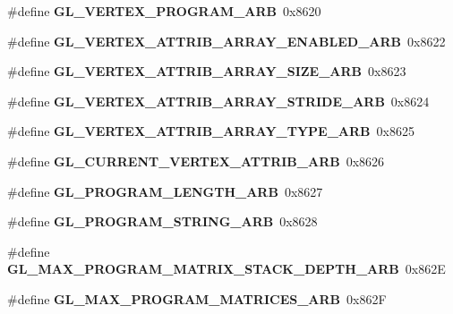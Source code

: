 \begin{DoxyCompactItemize}
\item 
\#define {\bfseries G\+L\+\_\+\+V\+E\+R\+T\+E\+X\+\_\+\+P\+R\+O\+G\+R\+A\+M\+\_\+\+A\+R\+B}~0x8620\label{_s_d_l__opengl_8h_ad7bcacc5d716c9b697d1af8f675ebabe}

\item 
\#define {\bfseries G\+L\+\_\+\+V\+E\+R\+T\+E\+X\+\_\+\+A\+T\+T\+R\+I\+B\+\_\+\+A\+R\+R\+A\+Y\+\_\+\+E\+N\+A\+B\+L\+E\+D\+\_\+\+A\+R\+B}~0x8622\label{_s_d_l__opengl_8h_ab0c8d4a94d427fc26d3cfea8ad421195}

\item 
\#define {\bfseries G\+L\+\_\+\+V\+E\+R\+T\+E\+X\+\_\+\+A\+T\+T\+R\+I\+B\+\_\+\+A\+R\+R\+A\+Y\+\_\+\+S\+I\+Z\+E\+\_\+\+A\+R\+B}~0x8623\label{_s_d_l__opengl_8h_a12dfc14fcd0b718af64b4726e2ef5518}

\item 
\#define {\bfseries G\+L\+\_\+\+V\+E\+R\+T\+E\+X\+\_\+\+A\+T\+T\+R\+I\+B\+\_\+\+A\+R\+R\+A\+Y\+\_\+\+S\+T\+R\+I\+D\+E\+\_\+\+A\+R\+B}~0x8624\label{_s_d_l__opengl_8h_ae19ac94f9452d930789a2d5c024cb629}

\item 
\#define {\bfseries G\+L\+\_\+\+V\+E\+R\+T\+E\+X\+\_\+\+A\+T\+T\+R\+I\+B\+\_\+\+A\+R\+R\+A\+Y\+\_\+\+T\+Y\+P\+E\+\_\+\+A\+R\+B}~0x8625\label{_s_d_l__opengl_8h_a85f6cec1279c8b32a355b23ad0ac0099}

\item 
\#define {\bfseries G\+L\+\_\+\+C\+U\+R\+R\+E\+N\+T\+\_\+\+V\+E\+R\+T\+E\+X\+\_\+\+A\+T\+T\+R\+I\+B\+\_\+\+A\+R\+B}~0x8626\label{_s_d_l__opengl_8h_a23aea7a14ad99161a2196c2317c25d1c}

\item 
\#define {\bfseries G\+L\+\_\+\+P\+R\+O\+G\+R\+A\+M\+\_\+\+L\+E\+N\+G\+T\+H\+\_\+\+A\+R\+B}~0x8627\label{_s_d_l__opengl_8h_a23301733f1a7e9626f1cf8cac242d3cb}

\item 
\#define {\bfseries G\+L\+\_\+\+P\+R\+O\+G\+R\+A\+M\+\_\+\+S\+T\+R\+I\+N\+G\+\_\+\+A\+R\+B}~0x8628\label{_s_d_l__opengl_8h_a1d170de8ba33fba4c1538c7237f60cfb}

\item 
\#define {\bfseries G\+L\+\_\+\+M\+A\+X\+\_\+\+P\+R\+O\+G\+R\+A\+M\+\_\+\+M\+A\+T\+R\+I\+X\+\_\+\+S\+T\+A\+C\+K\+\_\+\+D\+E\+P\+T\+H\+\_\+\+A\+R\+B}~0x862\+E\label{_s_d_l__opengl_8h_a7078ed0e4123499049d0785b8dbd7817}

\item 
\#define {\bfseries G\+L\+\_\+\+M\+A\+X\+\_\+\+P\+R\+O\+G\+R\+A\+M\+\_\+\+M\+A\+T\+R\+I\+C\+E\+S\+\_\+\+A\+R\+B}~0x862\+F\label{_s_d_l__opengl_8h_a2044a9276264b61227f5c07f86631f46}


\end{DoxyCompactItemize}
